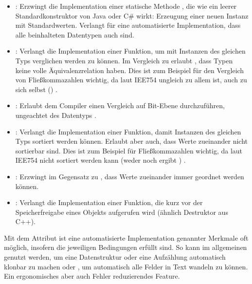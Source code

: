 \begin{itemize}
	\item {}: Erzwingt die Implementation einer statische Methode , die wie ein leerer Standardkonstruktor von Java oder C\# wirkt: Erzeugung einer neuen Instanz mit Standardwerten.
	Verlangt für eine automatisierte Implementation, dass alle beinhalteten Datentypen auch  sind.
	
	\item {}: Verlangt die Implementation einer Funktion, um mit Instanzen des gleichen Typs verglichen werden zu können.
	Im Vergleich zu  erlaubt , dass Typen keine volle Äquivalenzrelation haben.
	Dies ist zum Beispiel für den Vergleich von Fließkommazahlen wichtig, da laut IEE754   ungleich zu allem ist, auch zu sich selbst () \cite{wiki:nan}\cite[272-275]{rust:orly_programming}\cite{rust:doc:partialeq}.
	
	\item {}: Erlaubt dem Compiler einen Vergleich auf Bit-Ebene durchzuführen, ungeachtet des Datentyps \cite{rust:doc:eq}.
	
	\item {}: Verlangt die Implementation einer Funktion, damit Instanzen des gleichen Typs sortiert werden können. Erlaubt aber auch, dass Werte zueinander nicht sortierbar sind.
	Dies ist zum Beispiel für Fließkommazahlen wichtig, da laut IEE754   nicht sortiert werden kann (weder  noch  ergibt ) \cite{wiki:nan}\cite[275-277]{rust:orly_programming}\cite{rust:doc:partialord}.
	
	\item {}: Erzwingt im Gegensatz zu , dass Werte zueinander immer geordnet werden können.
	
	\item {}: Verlangt die Implementation einer Funktion, die kurz vor der Speicherfreigabe eines Objekts aufgerufen wird (ähnlich Destruktor aus C++).
\end{itemize}

Mit dem Attribut \rustcinline{#[derive(..)]} ist eine automatisierte Implementation genannter Merkmale oft möglich, insofern die jeweiligen Bedingungen erfüllt sind.
So kann im allgemeinen  genutzt werden, um eine Datenstruktur oder eine Aufzählung automatisch klonbar zu machen oder , um automatisch alle Felder in Text wandeln zu können.
Ein ergonomisches aber auch Fehler reduzierendes Feature.

